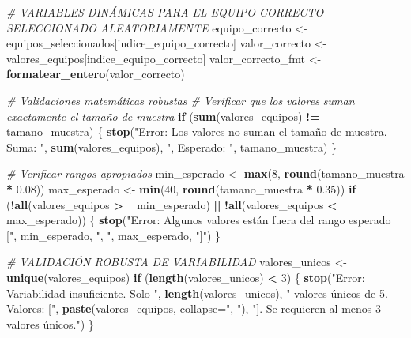 \documentclass[
]{article}
\newenvironment{Shaded}{\begin{snugshade}}{\end{snugshade}}
\newcommand{\AttributeTok}[1]{\textcolor[rgb]{0.13,0.29,0.53}{#1}}
\newcommand{\CommentTok}[1]{\textcolor[rgb]{0.56,0.35,0.01}{\textit{#1}}}
\newcommand{\ControlFlowTok}[1]{\textcolor[rgb]{0.13,0.29,0.53}{\textbf{#1}}}
\newcommand{\DecValTok}[1]{\textcolor[rgb]{0.00,0.00,0.81}{#1}}
\newcommand{\FloatTok}[1]{\textcolor[rgb]{0.00,0.00,0.81}{#1}}
\newcommand{\FunctionTok}[1]{\textcolor[rgb]{0.13,0.29,0.53}{\textbf{#1}}}
\newcommand{\NormalTok}[1]{#1}
\newcommand{\OtherTok}[1]{\textcolor[rgb]{0.56,0.35,0.01}{#1}}
\newcommand{\SpecialCharTok}[1]{\textcolor[rgb]{0.81,0.36,0.00}{\textbf{#1}}}
\newcommand{\StringTok}[1]{\textcolor[rgb]{0.31,0.60,0.02}{#1}}
\begin{document}
\begin{Shaded}
\begin{Highlighting}[]
\CommentTok{\# VARIABLES DINÁMICAS PARA EL EQUIPO CORRECTO SELECCIONADO ALEATORIAMENTE}
\NormalTok{equipo\_correcto }\OtherTok{\textless{}{-}}\NormalTok{ equipos\_seleccionados[indice\_equipo\_correcto]}
\NormalTok{valor\_correcto }\OtherTok{\textless{}{-}}\NormalTok{ valores\_equipos[indice\_equipo\_correcto]}
\NormalTok{valor\_correcto\_fmt }\OtherTok{\textless{}{-}} \FunctionTok{formatear\_entero}\NormalTok{(valor\_correcto)}

\CommentTok{\# Validaciones matemáticas robustas}
\CommentTok{\# Verificar que los valores suman exactamente el tamaño de muestra}
\ControlFlowTok{if}\NormalTok{ (}\FunctionTok{sum}\NormalTok{(valores\_equipos) }\SpecialCharTok{!=}\NormalTok{ tamano\_muestra) \{}
  \FunctionTok{stop}\NormalTok{(}\StringTok{"Error: Los valores no suman el tamaño de muestra. Suma: "}\NormalTok{, }\FunctionTok{sum}\NormalTok{(valores\_equipos),}
       \StringTok{", Esperado: "}\NormalTok{, tamano\_muestra)}
\NormalTok{\}}

\CommentTok{\# Verificar rangos apropiados}
\NormalTok{min\_esperado }\OtherTok{\textless{}{-}} \FunctionTok{max}\NormalTok{(}\DecValTok{8}\NormalTok{, }\FunctionTok{round}\NormalTok{(tamano\_muestra }\SpecialCharTok{*} \FloatTok{0.08}\NormalTok{))}
\NormalTok{max\_esperado }\OtherTok{\textless{}{-}} \FunctionTok{min}\NormalTok{(}\DecValTok{40}\NormalTok{, }\FunctionTok{round}\NormalTok{(tamano\_muestra }\SpecialCharTok{*} \FloatTok{0.35}\NormalTok{))}
\ControlFlowTok{if}\NormalTok{ (}\SpecialCharTok{!}\FunctionTok{all}\NormalTok{(valores\_equipos }\SpecialCharTok{\textgreater{}=}\NormalTok{ min\_esperado) }\SpecialCharTok{||} \SpecialCharTok{!}\FunctionTok{all}\NormalTok{(valores\_equipos }\SpecialCharTok{\textless{}=}\NormalTok{ max\_esperado)) \{}
  \FunctionTok{stop}\NormalTok{(}\StringTok{"Error: Algunos valores están fuera del rango esperado ["}\NormalTok{, min\_esperado, }\StringTok{", "}\NormalTok{, max\_esperado, }\StringTok{"]"}\NormalTok{)}
\NormalTok{\}}

\CommentTok{\# VALIDACIÓN ROBUSTA DE VARIABILIDAD}
\NormalTok{valores\_unicos }\OtherTok{\textless{}{-}} \FunctionTok{unique}\NormalTok{(valores\_equipos)}
\ControlFlowTok{if}\NormalTok{ (}\FunctionTok{length}\NormalTok{(valores\_unicos) }\SpecialCharTok{\textless{}} \DecValTok{3}\NormalTok{) \{}
  \FunctionTok{stop}\NormalTok{(}\StringTok{"Error: Variabilidad insuficiente. Solo "}\NormalTok{, }\FunctionTok{length}\NormalTok{(valores\_unicos),}
       \StringTok{" valores únicos de 5. Valores: ["}\NormalTok{, }\FunctionTok{paste}\NormalTok{(valores\_equipos, }\AttributeTok{collapse=}\StringTok{", "}\NormalTok{),}
       \StringTok{"]. Se requieren al menos 3 valores únicos."}\NormalTok{)}
\NormalTok{\}}


\end{Highlighting}
\end{Shaded}
\end{document}
